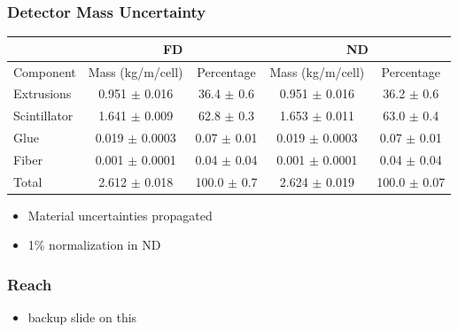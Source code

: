 \documentclass[10pt,professionalfonts,xcolor=table]{beamer}
\begin{document}
\begin{frame}
\frametitle{Detector Mass Uncertainty}
\begin{center}
\small
\begin{tabular}{|l|c|c|c|c|}
\hline
& \multicolumn{2}{c|}{FD} & \multicolumn{2}{c|}{ND} \\ \hline
Component    & Mass (kg/m/cell)   & Percentage & Mass (kg/m/cell) & Percentage \\ \hline
Extrusions   & 0.951 $\pm$ 0.016  & 36.4 $\pm$ 0.6  &  0.951 $\pm$ 0.016  & 36.2 $\pm$ 0.6 \\
Scintillator & 1.641 $\pm$ 0.009  & 62.8 $\pm$ 0.3  &  1.653 $\pm$ 0.011  & 63.0 $\pm$ 0.4 \\
Glue         & 0.019 $\pm$ 0.0003 & 0.07 $\pm$ 0.01 &  0.019 $\pm$ 0.0003 & 0.07 $\pm$ 0.01 \\
Fiber        & 0.001 $\pm$ 0.0001 & 0.04 $\pm$ 0.04 &  0.001 $\pm$ 0.0001 & 0.04 $\pm$ 0.04 \\ \hline
Total        & 2.612 $\pm$ 0.018  & 100.0 $\pm$ 0.7 &  2.624 $\pm$ 0.019  & 100.0 $\pm$ 0.07 \\ \hline
\end{tabular}
\end{center}

\begin{itemize}
\item Material uncertainties propagated
\item 1\% normalization in ND
\end{itemize}
\end{frame}


\begin{frame}
\frametitle{\nova Reach}

\begin{itemize}
\item backup slide on this
\end{itemize}
\end{frame}
\end{document}
